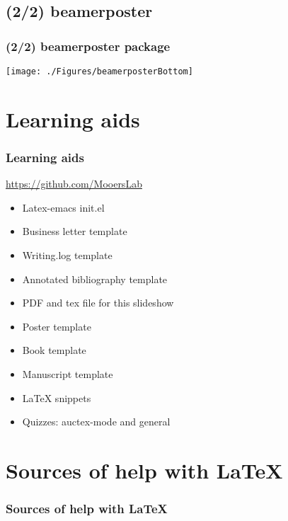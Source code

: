 \documentclass{beamer}
\newcommand{\heart}{\ensuremath\heartsuit}
\begin{document}
\subsection{(2/2) beamerposter}
\begin{frame}
\frametitle{(2/2) beamerposter package}
\begin{center}
    \texttt{[image: ./Figures/beamerposterBottom]}
\end{center}
\end{frame}
\note{}




\section{Learning aids}
\begin{frame}
\frametitle{Learning aids}
\begin{center}
\begin{Large}
 \url{https://github.com/MooersLab}
\begin{itemize}[font=$\bullet$\scshape\bfseries]
\item Latex-emacs init.el 
\item Business letter template
\item Writing.log template
\item Annotated bibliography template
\item PDF and tex file for this slideshow 
\item Poster template  
\item Book template
\item Manuscript template
\item LaTeX snippets
\item Quizzes: auctex-mode and general
\end{itemize}
\end{Large}
\end{center}
\end{frame}
\note{}




\section{Sources of help with \LaTeX}
\begin{frame}
\frametitle{Sources of help with \LaTeX }
\begin{center}
\begin{Large}
\end{Large}
\end{center}
\end{frame}
\note{}
\end{document}
